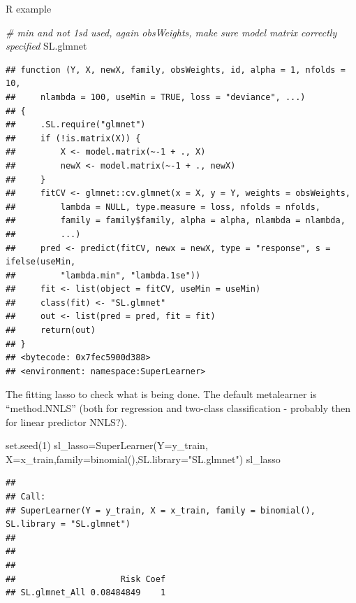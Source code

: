 \documentclass[
  ignorenonframetext,
]{beamer}
\newenvironment{Shaded}{\begin{snugshade}}{\end{snugshade}}
\newcommand{\AttributeTok}[1]{\textcolor[rgb]{0.77,0.63,0.00}{#1}}
\newcommand{\CommentTok}[1]{\textcolor[rgb]{0.56,0.35,0.01}{\textit{#1}}}
\newcommand{\DecValTok}[1]{\textcolor[rgb]{0.00,0.00,0.81}{#1}}
\newcommand{\FunctionTok}[1]{\textcolor[rgb]{0.00,0.00,0.00}{#1}}
\newcommand{\NormalTok}[1]{#1}
\newcommand{\OtherTok}[1]{\textcolor[rgb]{0.56,0.35,0.01}{#1}}
\newcommand{\SpecialCharTok}[1]{\textcolor[rgb]{0.00,0.00,0.00}{#1}}
\newcommand{\StringTok}[1]{\textcolor[rgb]{0.31,0.60,0.02}{#1}}
\begin{document}
\begin{frame}[fragile]
\begin{block}{R example}
\begin{Shaded}
\begin{Highlighting}[]
\CommentTok{\# min and not 1sd used, again obsWeights, make sure model matrix correctly specified}
\NormalTok{SL.glmnet}
\end{Highlighting}
\end{Shaded}

\begin{verbatim}
## function (Y, X, newX, family, obsWeights, id, alpha = 1, nfolds = 10, 
##     nlambda = 100, useMin = TRUE, loss = "deviance", ...) 
## {
##     .SL.require("glmnet")
##     if (!is.matrix(X)) {
##         X <- model.matrix(~-1 + ., X)
##         newX <- model.matrix(~-1 + ., newX)
##     }
##     fitCV <- glmnet::cv.glmnet(x = X, y = Y, weights = obsWeights, 
##         lambda = NULL, type.measure = loss, nfolds = nfolds, 
##         family = family$family, alpha = alpha, nlambda = nlambda, 
##         ...)
##     pred <- predict(fitCV, newx = newX, type = "response", s = ifelse(useMin, 
##         "lambda.min", "lambda.1se"))
##     fit <- list(object = fitCV, useMin = useMin)
##     class(fit) <- "SL.glmnet"
##     out <- list(pred = pred, fit = fit)
##     return(out)
## }
## <bytecode: 0x7fec5900d388>
## <environment: namespace:SuperLearner>
\end{verbatim}

The fitting lasso to check what is being done. The default metalearner
is ``method.NNLS'' (both for regression and two-class classification -
probably then for linear predictor NNLS?).

\begin{Shaded}
\begin{Highlighting}[]
\FunctionTok{set.seed}\NormalTok{(}\DecValTok{1}\NormalTok{)}
\NormalTok{sl\_lasso}\OtherTok{=}\FunctionTok{SuperLearner}\NormalTok{(}\AttributeTok{Y=}\NormalTok{y\_train, }\AttributeTok{X=}\NormalTok{x\_train,}\AttributeTok{family=}\FunctionTok{binomial}\NormalTok{(),}\AttributeTok{SL.library=}\StringTok{"SL.glmnet"}\NormalTok{)}
\NormalTok{sl\_lasso}
\end{Highlighting}
\end{Shaded}

\begin{verbatim}
## 
## Call:  
## SuperLearner(Y = y_train, X = x_train, family = binomial(), SL.library = "SL.glmnet") 
## 
## 
## 
##                     Risk Coef
## SL.glmnet_All 0.08484849    1
\end{verbatim}

\begin{Shaded}
\end{Shaded}


\end{block}
\end{frame}
\end{document}
